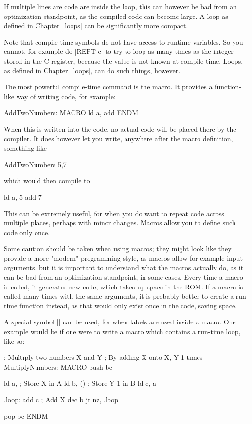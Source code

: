 \documentclass[11pt]{book}
\begin{document}
If multiple lines are code are inside the loop, this can however be bad from an optimization standpoint, as the compiled code can become large. A loop as defined in Chapter~\ref{loops} can be significantly more compact.

Note that compile-time symbols do not have access to runtime variables. So you cannot, for example do |REPT c| to try to loop as many times as the integer stored in the C register, because the value is not known at compile-time. Loops, as defined in Chapter~\ref{loops}, can do such things, however.

The most powerful compile-time command is the macro. It provides a function-like way of writing code, for example:

\begin{code}
AddTwoNumbers: MACRO
    ld a, \1
    add \2
ENDM
\end{code}

When this is written into the code, no actual code will be placed there by the compiler. It does however let you write, anywhere after the macro definition, something like

\begin{code}
AddTwoNumbers 5,7
\end{code}

which would then compile to 

\begin{code}
ld a, 5
add 7
\end{code}

This can be extremely useful, for when you do want to repeat code across multiple places, perhaps with minor changes. Macros allow you to define such code only once. 

Some caution should be taken when using macros; they might look like they provide a more "modern" programming style, as macros allow for example input arguments, but it is important to understand what the macros actually do, as it can be bad from an optimization standpoint, in some cases. Every time a macro is called, it generates new code, which takes up space in the ROM. If a macro is called many times with the same arguments, it is probably better to create a run-time function instead, as that would only exist once in the code, saving space.

A special symbol |\@| can be used, for when labels are used inside a macro. One example would be if one were to write a macro which contains a run-time loop, like so:

\begin{code}
; Multiply two numbers X and Y
; By adding X onto X, Y-1 times
MultiplyNumbers: MACRO
	push bc

    ld a, \1 ; Store X in A 
    ld b, () ; Store Y-1 in B
    ld c, a 
    
.loop\@:
    add c ; Add X
    dec b
    jr nz, .loop\@
    
    pop bc 
ENDM    
\end{code}
\end{document}
